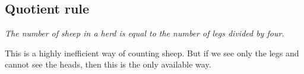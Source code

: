 \subsection{Quotient rule}
\begin{center}
\parbox{.9\textwidth}{\emph{The number of sheep in a herd is equal to the number of legs divided by four.}}
\end{center}
This is a highly inefficient way of counting sheep.
But if we see only the legs and cannot see the heads, then this is the only available way.
